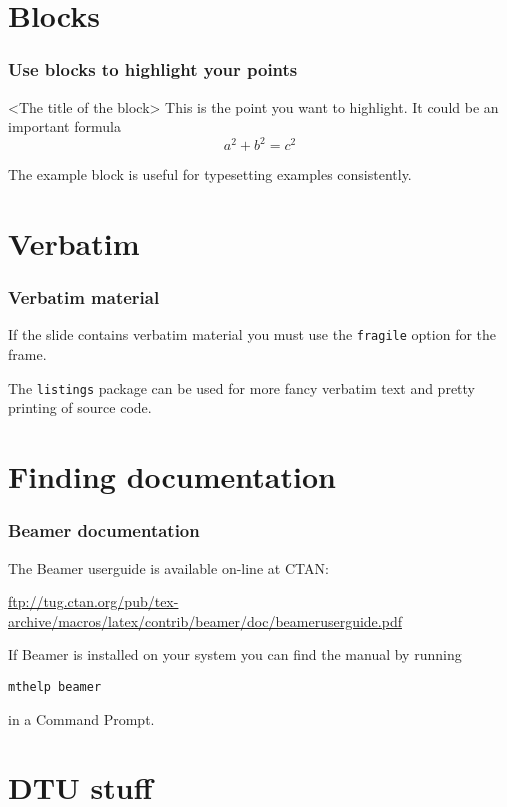 \documentclass[presentation]{beamer}   %
\begin{document}
\section{Blocks}
\begin{frame}
  \frametitle{Use blocks to highlight your points}
  \begin{block}{<The title of the block>}
    This is the point you want to highlight. It could be an important formula
    \[
      a^2+b^2=c^2
    \]
  \end{block}

  \begin{example}
    The example block is useful for typesetting examples consistently.
  \end{example}
\end{frame}

\section{Verbatim}
\begin{frame}[fragile]
  \frametitle{Verbatim material}
  If the slide contains verbatim material you must use the \texttt{fragile} option for the frame.


  
  The \texttt{listings} package can be used for more fancy verbatim text and pretty printing of source code.
\end{frame}

\section{Finding documentation}
\begin{frame}
  \frametitle{Beamer documentation}
  The Beamer userguide is available on-line at CTAN:
  \begin{center}
    \url{ftp://tug.ctan.org/pub/tex-archive/macros/latex/contrib/beamer/doc/beameruserguide.pdf}
  \end{center}

  If Beamer is installed on your system you can find the manual by running
  \begin{center}
    \texttt{mthelp beamer}
  \end{center}
  in a Command Prompt.
\end{frame}

\section{DTU stuff}
\end{document}
